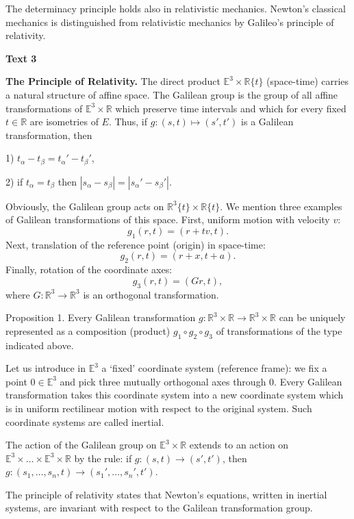 \documentclass[a4paper]{article}
\newcommand{\ESect}[1]{\medskip\par{\large \textbf{#1}}\par}
\begin{document}
The determinacy principle holds also in relativistic mechanics. Newton's classical mechanics is distinguished from relativistic
mechanics by Galileo's principle of relativity.

\ESect{Text 3}
\textbf{The Principle of Relativity.} The direct product $\mathbb{E}^3 \times \mathbb{R}\{t\}$ (space-time) carries a natural
structure of affine space. The Galilean group is the group of all affine transformations of $\mathbb{E}^3 \times \mathbb{R}$ which
preserve time intervals and which for every fixed $t \in \mathbb{R}$ are isometries of $E$. Thus, if $g: (s,t) \mapsto (s',t')$
is a Galilean transformation, then

1) $t_\alpha - t_\beta = t_\alpha' - t_\beta'$,

2) if $t_\alpha=t_\beta$ then $|s_\alpha - s_\beta| = |s_\alpha' - s_\beta'|$.

Obviously, the Galilean group acts on $\mathbb{R}^3\{t\} \times \mathbb{R}\{t\}$. We mention three examples of Galilean
transformations of this space. First, uniform motion with velocity $v$:
$$g_1(r,t)=(r+tv,t).$$
Next, translation of the reference point (origin) in space-time:
$$g_2(r,t)=(r+x,t+a).$$
Finally, rotation of the coordinate axes:
$$g_3(r,t)=(Gr,t),$$
where $G: \mathbb{R}^3 \rightarrow \mathbb{R}^3$ is an orthogonal transformation.

Proposition 1. Every Galilean transformation $g: \mathbb{R}^3 \times \mathbb{R} \rightarrow \mathbb{R}^3 \times \mathbb{R}$ can
be uniquely represented as a composition (product) $g_1 \circ g_2 \circ g_3$ of transformations of the type indicated above.

Let us introduce in $\mathbb{E}^3$ a `fixed' coordinate system (reference frame): we fix a point $0 \in \mathbb{E}^3$ and pick
three mutually orthogonal axes through 0. Every Galilean transformation takes this coordinate system into a new coordinate system
which is in uniform rectilinear motion with respect to the original system. Such coordinate systems are called inertial.

The action of the Galilean group on $\mathbb{E}^3 \times \mathbb{R}$ extends to an action on
$\mathbb{E}^3 \times \ldots \times \mathbb{E}^3 \times \mathbb{R}$ by the rule: if $g: (s,t) \rightarrow (s',t')$, then
$g: (s_1,\ldots,s_n,t) \rightarrow (s_1',\ldots,s_n', t')$.

The principle of relativity states that Newton's equations, written in inertial systems, are invariant with respect to the
Galilean transformation group.
\end{document}
